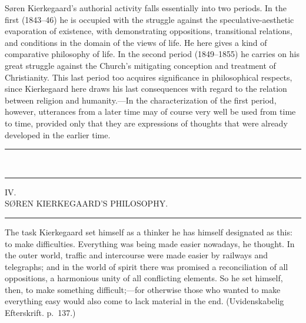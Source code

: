 \documentclass[12pt,a4paper]{book}
\newcommand{\opage}[1]{\marginnote{\footnotesize\textit{[#1]}}}
\begin{document}
Søren Kierkegaard's authorial activity falls essentially into two periods.
In the first (1843--46) he is occupied with the struggle against the
speculative-aesthetic evaporation of existence, with demonstrating
oppositions, transitional relations, and conditions in the domain of the
views of life. He here gives a kind of comparative philosophy of life. In
the second period (1849--1855) he carries on his great struggle against
the Church's mitigating conception and treatment of Christianity. This
last period too acquires significance in philosophical respects, since
Kierkegaard here draws his last consequences with regard to the relation
between religion and humanity.---In the characterization of the first
period, however, utterances from a later time may of course very well be
used from time to time, provided only that they are expressions of
thoughts that were already developed in the earlier time.
\begin{center}\rule{2cm}{0.4pt}\\[-8pt]\rule{2cm}{0.4pt}\end{center}

\opage{54}\begin{center}IV.\\[4pt] SØREN KIERKEGAARD'S PHILOSOPHY.\\[4pt]\rule{1.5cm}{0.4pt}\end{center}

The task Kierkegaard set himself as a thinker he has himself designated
as this: to make difficulties. Everything was being made easier nowadays,
he thought. In the outer world, traffic and intercourse were made easier
by railways and telegraphs; and in the world of spirit there was promised
a reconciliation of all oppositions, a harmonious unity of all conflicting
elements. So he set himself, then, to make something difficult;---for
otherwise those who wanted to make everything easy would also come to lack
material in the end. (Uvidenskabelig Efterskrift. p.~137.)
\end{document}
